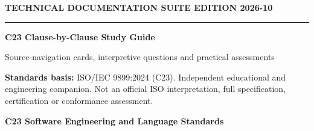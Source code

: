 \documentclass[10pt,letterpaper,oneside]{report}
\begin{document}
\hypersetup{pageanchor=false}%
\begin{titlepage}
\color{ink}\vspace*{1.2in}
{\sffamily\small\color{accent}\bfseries TECHNICAL DOCUMENTATION SUITE \hfill EDITION 2026-10}\par
\vspace{.3in}\rule{\linewidth}{1.5pt}\par\vspace{.22in}
{\Huge\bfseries C23 Clause-by-Clause Study Guide}\par\vspace{.22in}
{\Large\color{grayblue}Source-navigation cards, interpretive questions and practical assessments}\par\vspace{.4in}
\begin{keybox}\textbf{Standards basis:} ISO/IEC 9899:2024 (C23). Independent educational and engineering companion. Not an official ISO interpretation, full specification, certification or conformance assessment.\end{keybox}
\vfill{\large\bfseries C23 Software Engineering and Language Standards}\par{}\par
\end{titlepage}\hypersetup{pageanchor=true}
\tableofcontents\clearpage{}
\end{document}
